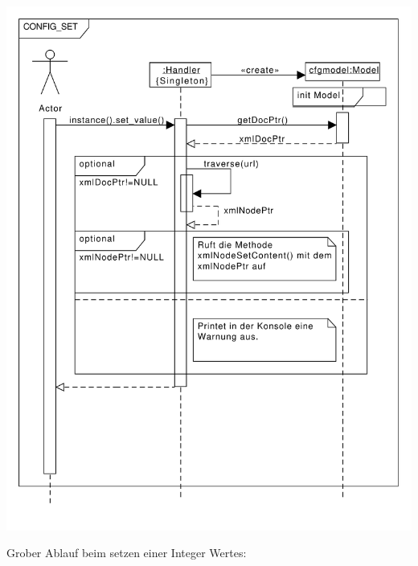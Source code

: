 \includegraphics[scale=0.5]{configset.pdf}
\label{c_configset}

Grober Ablauf beim setzen einer Integer Wertes:



